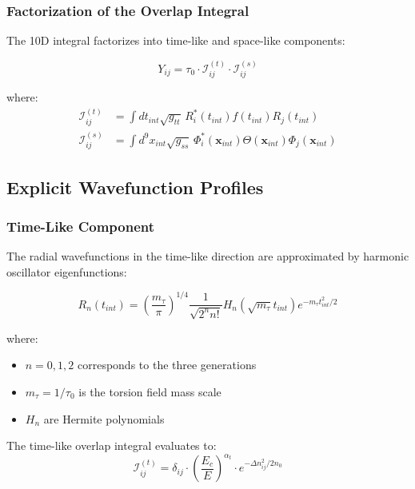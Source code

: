 \subsubsection{Factorization of the Overlap Integral}

The 10D integral factorizes into time-like and space-like components:

\begin{equation}
    Y_{ij} = \tau_0 \cdot \mathcal{I}_{ij}^{(t)} \cdot \mathcal{I}_{ij}^{(s)}
\end{equation}

where:
\begin{align}
    \mathcal{I}_{ij}^{(t)} &= \int dt_{int} \sqrt{g_{tt}} \, R_i^*(t_{int}) f(t_{int}) R_j(t_{int}) \\
    \mathcal{I}_{ij}^{(s)} &= \int d^9x_{int} \sqrt{g_{ss}} \, \Phi_i^*(\mathbf{x}_{int}) \Theta(\mathbf{x}_{int}) \Phi_j(\mathbf{x}_{int})
\end{align}

\subsection{Explicit Wavefunction Profiles}

\subsubsection{Time-Like Component}

The radial wavefunctions in the time-like direction are approximated by harmonic oscillator eigenfunctions:

\begin{equation}
    R_n(t_{int}) = \left(\frac{m_\tau}{\pi}\right)^{1/4} \frac{1}{\sqrt{2^n n!}} H_n(\sqrt{m_\tau} t_{int}) e^{-m_\tau t_{int}^2/2}
\end{equation}

where:
\begin{itemize}
    \item $n = 0, 1, 2$ corresponds to the three generations
    \item $m_\tau = 1/\tau_0$ is the torsion field mass scale
    \item $H_n$ are Hermite polynomials
\end{itemize}

The time-like overlap integral evaluates to:
\begin{equation}
    \mathcal{I}_{ij}^{(t)} = \delta_{ij} \cdot \left(\frac{E_c}{E}\right)^{\alpha_t} \cdot e^{-\Delta n_{ij}^2/2n_0}
\end{equation}

